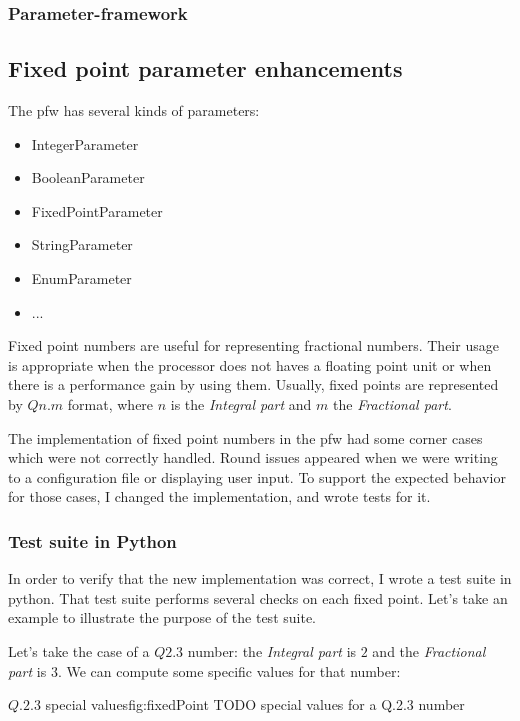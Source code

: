 \subsubsection{Parameter-framework}

\subsection{Fixed point parameter enhancements}
The \gls{pfw} has several kinds of parameters:
\begin{itemize}
    \item IntegerParameter
    \item BooleanParameter
    \item FixedPointParameter
    \item StringParameter
    \item EnumParameter
    \item ...
\end{itemize}

Fixed point numbers are useful for representing fractional numbers. Their
usage is appropriate when the processor does not haves a floating point unit
or when there is a performance gain by using them. Usually, fixed points are
represented by $Qn.m$ format, where $n$ is the \emph{Integral part} and $m$ the
\emph{Fractional part}.

The implementation of fixed point numbers in the \gls{pfw} had some
corner cases which were not correctly handled. Round issues appeared when we
were writing to a configuration file or displaying user input. To
support the expected behavior for those cases, I changed the implementation, and
wrote tests for it.

\subsubsection{Test suite in Python}

In order to verify that the new implementation was correct, I wrote a test suite
in \gls{python}. That test suite performs several checks on each fixed point. Let's
take an example to illustrate the purpose of the test suite.

Let's take the case of a $Q2.3$ number: the \emph{Integral part} is $2$ and the
\emph{Fractional part} is $3$. We can compute some specific values for that number:

\begin{figureGraphics}{$Q.2.3$ special values}{fig:fixedPoint}
    TODO special values for a Q.2.3 number
\end{figureGraphics}

